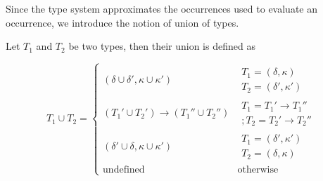 \documentclass{llncs}
\begin{document}
Since the type system approximates the occurrences used to evaluate an occurrence, we introduce the notion of union of types. %

\begin{definition}
  	Let $T_1$ and $T_2$ be two types, then their union is defined as

  \[
T_1\cup T_2=
    \begin{cases}
      (\delta\cup\delta',\kappa\cup\kappa') & \begin{array}{l}
                                                T_1=(\delta,\kappa) \\
      T_2=(\delta',\kappa') \end{array} \\[3mm]
       (T_1'\cup T_2')\rightarrow (T_1''\cup T_2'') &
       \begin{array}{l} T_1=T_1'\rightarrow T_1'' \\;T_2=T_2'\rightarrow
       T_2''  \end{array}\\[3mm]
       (\delta' \cup \delta, \kappa \cup \kappa') & \begin{array}{l}
                                                      T_1 =
                                                      (\delta',\kappa') \\
                                                      T_2 =
                                                      (\delta,\kappa) \end{array}
                                                    \\[3mm]
       \text{undefined} & \text{otherwise}
    \end{cases}
\]
\end{definition}
\end{document}
